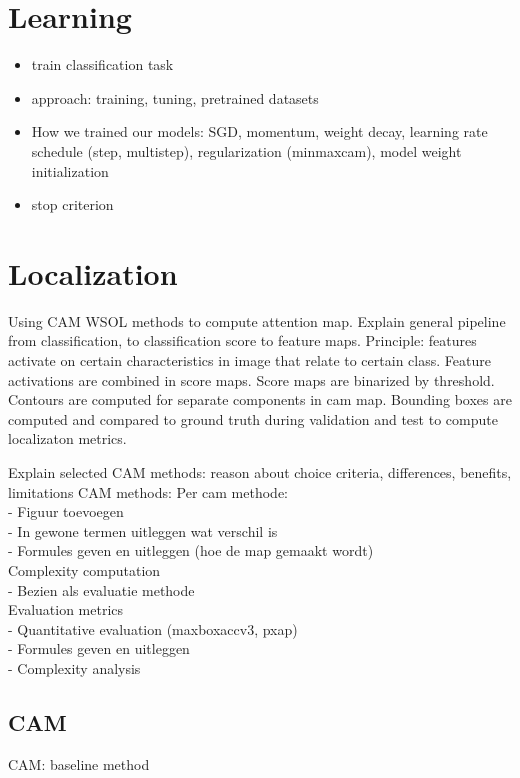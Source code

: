 \section{Learning}
\begin{itemize}
    \item train classification task
    \item approach: training, tuning, pretrained datasets
    \item How we trained our models: SGD, momentum, weight decay, learning rate schedule (step, multistep), regularization (minmaxcam), model weight initialization
    \item stop criterion
\end{itemize}

\section{Localization}
Using CAM WSOL methods to compute attention map. Explain general pipeline from classification, to classification score to feature maps. Principle: features activate on certain characteristics in image that relate to certain class. Feature activations are combined in score maps. Score maps are binarized by threshold. Contours are computed for separate components in cam map. Bounding boxes are computed and compared to ground truth during validation and test to compute localizaton metrics.

Explain selected CAM methods: reason about choice criteria, differences, benefits, limitations
CAM methods: Per cam methode: \\
- Figuur toevoegen \\
- In gewone termen uitleggen wat verschil is \\
- Formules geven en uitleggen (hoe de map gemaakt wordt) \\
Complexity computation \\
- Bezien als evaluatie methode \\
Evaluation metrics \\
- Quantitative evaluation (maxboxaccv3, pxap) \\
- Formules geven en uitleggen \\
- Complexity analysis \\

\subsection{CAM}
CAM: baseline method


